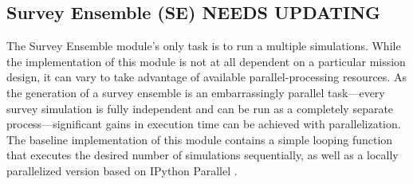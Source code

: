 \documentclass[]{asme2ej}
\begin{document}
\subsection{Survey Ensemble (SE) NEEDS UPDATING}
The Survey Ensemble module's only task is to run a multiple simulations.  While the implementation of this module is not at all dependent on a particular mission design, it can vary to take advantage of available parallel-processing resources.  As the generation of a survey ensemble is an embarrassingly parallel task---every survey simulation is fully independent and can be run as a completely separate process---significant gains in execution time can be achieved with parallelization.  The baseline implementation of this module contains a simple looping function that executes the desired number of simulations sequentially, as well as a locally parallelized version based on IPython Parallel  \citep{perez2007ipython}.



 
\end{document}
